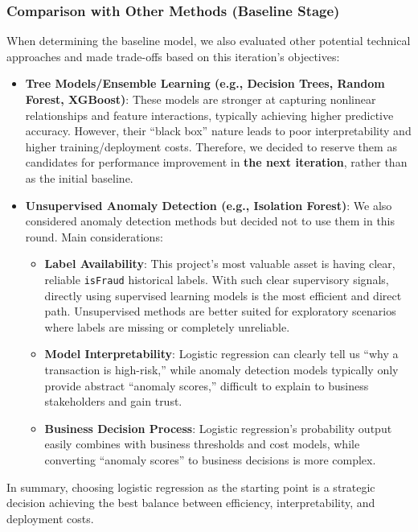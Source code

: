 \documentclass[sigplan,screen]{acmart}
\begin{document}
\subsubsection{Comparison with Other Methods (Baseline Stage)}

When determining the baseline model, we also evaluated other potential technical approaches and made trade-offs based on this iteration's objectives:

\begin{itemize}
    \item \textbf{Tree Models/Ensemble Learning (e.g., Decision Trees, Random Forest, XGBoost)}: These models are stronger at capturing nonlinear relationships and feature interactions, typically achieving higher predictive accuracy. However, their ``black box'' nature leads to poor interpretability and higher training/deployment costs. Therefore, we decided to reserve them as candidates for performance improvement in \textbf{the next iteration}, rather than as the initial baseline.
    \item \textbf{Unsupervised Anomaly Detection (e.g., Isolation Forest)}: We also considered anomaly detection methods but decided not to use them in this round. Main considerations:
\begin{itemize}
        \item \textbf{Label Availability}: This project's most valuable asset is having clear, reliable \texttt{isFraud} historical labels. With such clear supervisory signals, directly using supervised learning models is the most efficient and direct path. Unsupervised methods are better suited for exploratory scenarios where labels are missing or completely unreliable.
        \item \textbf{Model Interpretability}: Logistic regression can clearly tell us ``why a transaction is high-risk,'' while anomaly detection models typically only provide abstract ``anomaly scores,'' difficult to explain to business stakeholders and gain trust.
        \item \textbf{Business Decision Process}: Logistic regression's probability output easily combines with business thresholds and cost models, while converting ``anomaly scores'' to business decisions is more complex.
\end{itemize}
\end{itemize}

In summary, choosing logistic regression as the starting point is a strategic decision achieving the best balance between efficiency, interpretability, and deployment costs.
\end{document}
